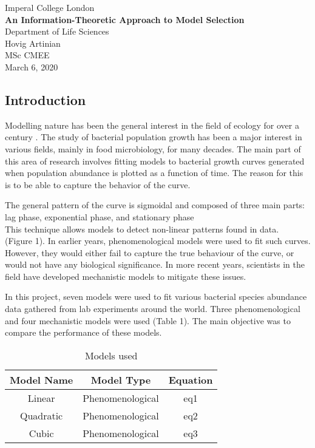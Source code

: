 \documentclass[11pt]{article}
\newcommand\wordcount{}
\begin{document}
	\begin{titlepage}
		\centering
		\vspace*{\fill}
		Imperal College London\\
		\textbf{An Information-Theoretic Approach to Model Selection}\\
		Department of Life Sciences\\
		\hfill \break
		\hfill \break
		Hovig Artinian\\
		MSc CMEE\\
		March 6, 2020
		\vspace*{\fill}
	\end{titlepage}

	\begin{linenumbers}
	\section{Introduction}

	Modelling nature has been the general interest in the field of ecology for over a century \cite{Kingsland1995}. 
	The study of bacterial population growth has been a major interest in various fields, mainly in food microbiology, for many decades. The main part of this area of research involves fitting models to bacterial growth curves generated when population abundance is plotted as a function of time. The reason for this is to be able to capture the behavior of the curve.
	\par The general pattern of the curve is sigmoidal and composed of three main parts: lag phase, exponential phase, and stationary phase %
	\\
	This technique allows models to detect non-linear patterns found in data.\\
	(Figure 1). In earlier years, phenomenological models were used to fit such curves. However, they would either fail to capture the true behaviour of the curve, or would not have any biological significance. In more recent years, scientists in the field have developed mechanistic models to mitigate these issues.
	\par In this project, seven models were used to fit various bacterial species abundance data gathered from lab experiments around the world. Three phenomenological and four mechanistic models were used (Table 1). The main objective was to compare the performance of these models.

	\begin{table}[ht]
		\centering
		\begin{tabular}{|c|c|c|}
		\hline
		Model Name & Model Type & Equation \\
		\hline
		\hline
		Linear & Phenomenological & eq1 \\
		\hline
		Quadratic & Phenomenological & eq2 \\
		\hline
		Cubic & Phenomenological & eq3 \\
		\hline
		\end{tabular}
		\caption{Models used}
		\label{tab:models}
	\end{table}


\end{linenumbers}
\end{document}
